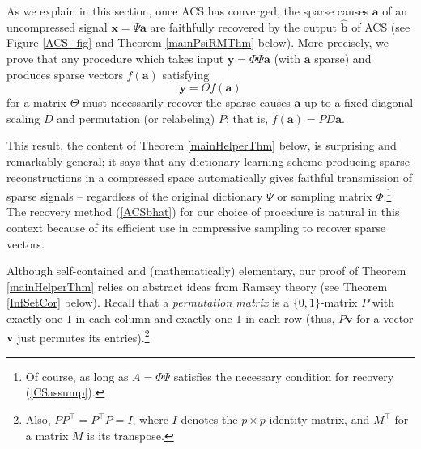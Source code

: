 \documentclass[11pt]{amsart}
\begin{document}
As we explain in this section, once ACS has converged, the sparse causes $\mathbf{a}$ of an uncompressed signal $\mathbf{x} = \Psi \mathbf{a}$ are faithfully recovered by the output $\widehat{\mathbf{b}}$ of ACS (see Figure \ref{ACS_fig} and Theorem \ref{mainPsiRMThm} below).   
More precisely, we prove that any procedure which takes input $\mathbf{y} = \Phi \Psi \mathbf{a}$ (with $\mathbf{a}$ sparse) and produces sparse vectors $f(\mathbf{a})$ satisfying \[\mathbf{y} = \Theta f(\mathbf{a})\] 
for a matrix $\Theta$ must necessarily recover the sparse causes $\mathbf{a}$ up to a fixed diagonal scaling $D$ and permutation (or relabeling) $P$; that is, $f(\mathbf{a}) = PD\mathbf{a}$.  

This result, the content of Theorem \ref{mainHelperThm} below, is surprising and remarkably general; it says that any dictionary learning scheme producing sparse reconstructions in a compressed space automatically gives faithful transmission of sparse signals -- regardless of the original dictionary $\Psi$ or sampling matrix $\Phi$.\footnote{Of course, as long as $A= \Phi \Psi$ satisfies the necessary condition for recovery (\ref{CSassump}).} The recovery method (\ref{ACSbhat}) for our choice of procedure is natural in this context because of its efficient use in compressive sampling \cite{candes2006} to recover sparse vectors. 

Although self-contained and (mathematically) elementary, our proof of Theorem \ref{mainHelperThm} relies on abstract ideas from Ramsey theory (see Theorem \ref{InfSetCor} below).  Recall that a \textit{permutation matrix} is a $\{0,1\}$-matrix $P$ with exactly one $1$ in each column and exactly one $1$ in each row (thus, $P\mathbf{v}$ for a vector $\mathbf{v}$ just permutes its entries).\footnote{Also, $PP^{\top} = P^{\top}P = I$, where $I$ denotes the $p \times p$ identity matrix, and $M^{\top}$ for a matrix $M$ is its transpose.}  
\end{document}
